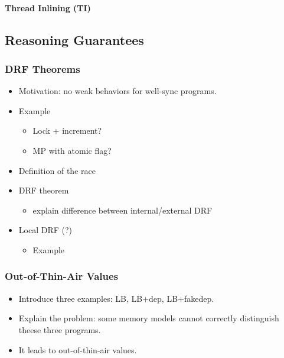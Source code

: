 \paragraph{Thread Inlining (TI)}

\subsection{Reasoning Guarantees}

\subsubsection{DRF Theorems}
\label{sec:background-drf}

\begin{itemize}
  \item Motivation: no weak behaviors for well-sync programs.
  \item Example
  \begin{itemize}
    \item Lock + increment?
    \item MP with atomic flag?
  \end{itemize}
  \item Definition of the race
  \item DRF theorem
  \begin{itemize}
    \item explain difference between internal/external DRF
  \end{itemize}
  \item Local DRF (?)
  \begin{itemize}
    \item Example
  \end{itemize}
\end{itemize}

\subsubsection{Out-of-Thin-Air Values}
\label{sec:bgrnd-oota}

\begin{itemize}
  \item Introduce three examples: LB, LB+dep, LB+fakedep.
  \item Explain the problem: some memory models cannot 
    correctly distinguish theese three programs.
  \item It leads to out-of-thin-air values.
\end{itemize}

